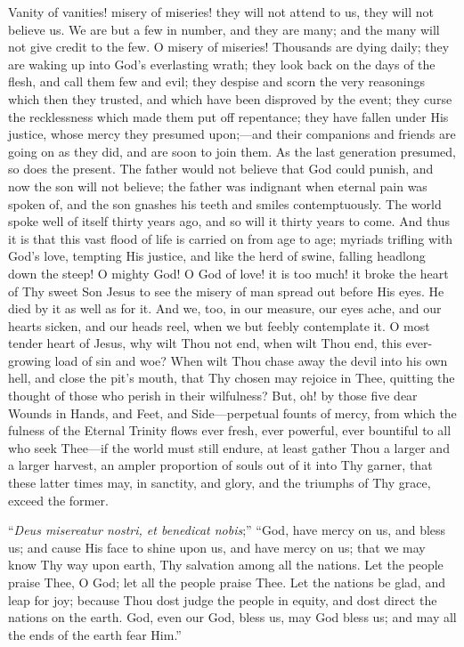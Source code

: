 Vanity of vanities! misery of miseries! they will not attend to us,
they will not believe us. We are but a few in number, and they are
many; and the many will not give credit to the few. O misery of
miseries! Thousands are dying daily; they are waking up into God's
everlasting wrath; they look back on the days of the flesh, and call
them few and evil; they despise and scorn the very reasonings which
then they trusted, and which have been disproved by the event; they
curse the recklessness which made them put off repentance; they have
fallen under His justice, whose mercy they presumed upon;—and their
companions and friends are going on as they did, and are soon to join
them. As the last generation presumed, so does the present. The father
would not believe that God could punish, and now the son will not
believe; the father was indignant when eternal pain was spoken of, and
the son gnashes his teeth and smiles contemptuously. The world spoke
well of itself thirty years ago, and so will it thirty years to come.
And thus it is that this vast flood of life is carried on from age to
age; myriads trifling with God's love, tempting His justice, and like
the herd of swine, falling headlong down the steep! O mighty God! O
God of love! it is too much! it broke the heart of Thy sweet Son Jesus
to see the misery of man spread out before His eyes. He died by it as
well as for it. And we, too, in our measure, our eyes ache, and our
hearts sicken, and our heads reel, when we but feebly contemplate it.
O most tender heart of Jesus, why wilt Thou not end, when wilt Thou
end, this ever-growing load of sin and woe? When wilt Thou chase away
the devil into his own hell, and close the pit's mouth, that Thy
chosen may rejoice in Thee, quitting the thought of those who perish
in their wilfulness? But, oh! by those five dear Wounds in Hands, and
Feet, and Side—perpetual founts of mercy, from which the fulness of
the Eternal Trinity flows ever fresh, ever powerful, ever bountiful to
all who seek Thee—if the world must still endure, at least gather
Thou a larger and a larger harvest, an ampler proportion of souls out
of it into Thy garner, that these latter times may, in sanctity, and
glory, and the triumphs of Thy grace, exceed the former.

``\emph{Deus misereatur nostri, et benedicat nobis};'' ``God,
have mercy on us, and bless us; and cause His face to shine upon us,
and have mercy on us; that we may know Thy way upon earth, Thy
salvation among all the nations. Let the people praise Thee, O God;
let all the people praise Thee. Let the nations be glad, and leap for
joy; because Thou dost judge the people in equity, and dost direct the
nations on the earth. God, even our God, bless us, may God bless us;
and may all the ends of the earth fear Him.''

